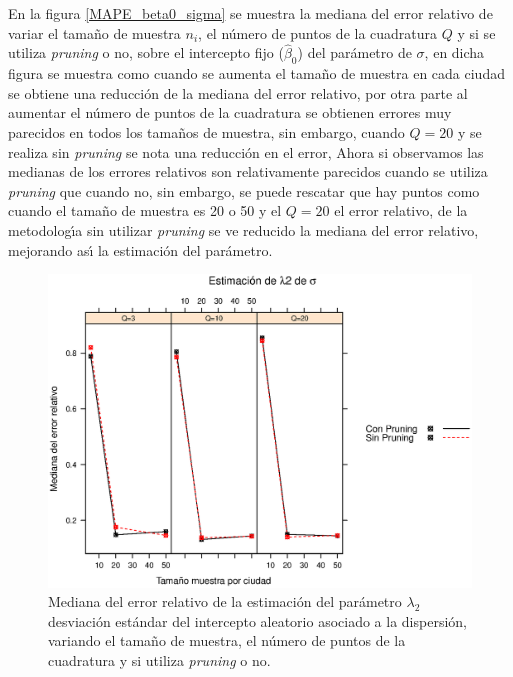 En la figura \ref{MAPE_beta0_sigma} se muestra la mediana del error relativo de variar el tama\~{n}o de muestra $n_i$, el n\'{u}mero de puntos de la cuadratura $Q$ y si se utiliza \textit{pruning} o no, sobre el intercepto fijo ($\hat{\beta}_0$) del par\'{a}metro de $\sigma$, en dicha figura se muestra como cuando se aumenta el tama\~{n}o de muestra en cada ciudad se obtiene una reducci\'{o}n de la mediana del error relativo, por otra parte al aumentar el n\'{u}mero de puntos de la cuadratura se obtienen errores muy parecidos en todos los tama\~{n}os de muestra, sin embargo, cuando $Q=20$ y se realiza sin \textit{pruning} se nota una reducci\'{o}n en el error, Ahora si observamos las medianas de los errores relativos son relativamente parecidos cuando se utiliza \textit{pruning} que cuando no, sin embargo, se puede rescatar que hay puntos como cuando el tama\~{n}o de muestra es 20 o 50 y el $Q=20$ el error relativo, de la metodolog\'{\i}a sin utilizar \textit{pruning} se ve reducido la mediana del error relativo, mejorando as\'{\i} la estimaci\'{o}n del par\'{a}metro.\\

\begin{figure}
	\begin{center}
		\includegraphics[scale=0.6]{MAPE_lambda2_sigma.eps}	
		\caption{Mediana del error relativo de la estimaci\'{o}n del par\'{a}metro $\lambda_2$ desviaci\'{o}n est\'{a}ndar del intercepto aleatorio asociado a la dispersi\'{o}n, variando el tama\~{n}o de muestra, el n\'{u}mero de puntos de la cuadratura y si utiliza \textit{pruning} o no.}
		\label{MAPE_lambda2_sigma}
	\end{center}
\end{figure}

